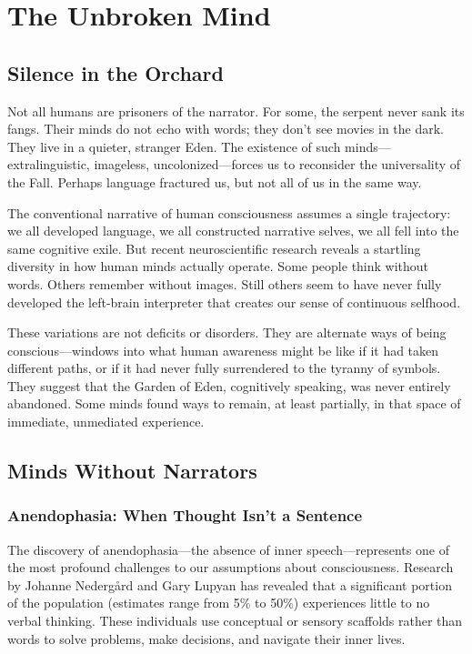 \chapter{The Unbroken Mind}

\section{Silence in the Orchard}

Not all humans are prisoners of the narrator. For some, the serpent never sank its fangs. Their minds do not echo with words; they don't see movies in the dark. They live in a quieter, stranger Eden. The existence of such minds—extralinguistic, imageless, uncolonized—forces us to reconsider the universality of the Fall. Perhaps language fractured us, but not all of us in the same way.

The conventional narrative of human consciousness assumes a single trajectory: we all developed language, we all constructed narrative selves, we all fell into the same cognitive exile. But recent neuroscientific research reveals a startling diversity in how human minds actually operate. Some people think without words. Others remember without images. Still others seem to have never fully developed the left-brain interpreter that creates our sense of continuous selfhood.

These variations are not deficits or disorders. They are alternate ways of being conscious—windows into what human awareness might be like if it had taken different paths, or if it had never fully surrendered to the tyranny of symbols. They suggest that the Garden of Eden, cognitively speaking, was never entirely abandoned. Some minds found ways to remain, at least partially, in that space of immediate, unmediated experience.

\section{Minds Without Narrators}

\subsection{Anendophasia: When Thought Isn't a Sentence}

The discovery of anendophasia—the absence of inner speech—represents one of the most profound challenges to our assumptions about consciousness. Research by Johanne Nedergård and Gary Lupyan has revealed that a significant portion of the population (estimates range from 5\% to 50\%) experiences little to no verbal thinking. These individuals use conceptual or sensory scaffolds rather than words to solve problems, make decisions, and navigate their inner lives.

